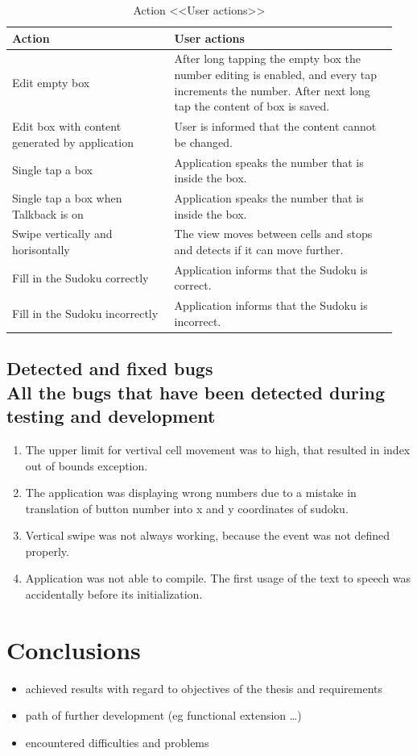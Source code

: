 \documentclass[a4paper,twoside,12pt]{book}
\newcommand\tabularhead[1]{
\begin{table}[h]
  \caption{Action <<#1>>}
  \begin{tabular}{|p{0.4\linewidth}|p{0.55\linewidth}|}
    \hline
    \textbf{Action} & \textbf{#1} \\
    \hline}
\newcommand\addrow[2]{#1 &#2\\ \hline}
\newcommand\addmulrow[2]{ \begin{minipage}[t][][t]{2.5cm}#1\end{minipage}%
     &\begin{minipage}[t][][t]{8cm}
      \begin{enumerate} #2   \end{enumerate}
      \end{minipage}\\ }
\newenvironment{usecase}{\tabularhead}
{\hline\end{tabular}\end{table}}
\begin{document}
\begin{usecase}{User actions}
    \addrow{Edit empty box}{After long tapping the empty box the number editing is enabled, and every tap increments the number. After next long tap the content of box is saved.}

    \addrow{Edit box with content generated by application}{User is informed that the content cannot be changed.}

	\addrow{Single tap a box}{Application speaks the number that is inside the box.}
	\addrow{Single tap a box when Talkback is on}{Application speaks the number that is inside the box.}
	\addrow{Swipe vertically and horisontally}{The view moves between cells and stops and detects if it can move further.}
	\addrow{Fill in the Sudoku correctly}{Application informs that the Sudoku is correct.}
	\addrow{Fill in the Sudoku incorrectly}{Application informs that the Sudoku is incorrect.}
	
\end{usecase}

\section{Detected and fixed bugs\\ {\large All the bugs that have been detected during testing and development }}

\begin{enumerate}
	\item The upper limit for vertival cell movement was to high, that resulted in index out of bounds exception.
	\item The application was displaying wrong numbers due to a mistake in translation of button number into x and y coordinates of sudoku.
	\item Vertical swipe was not always working, because the event was not defined properly.
	\item Application was not able to compile. The first usage of the text to speech was accidentally before its initialization.
\end{enumerate}


\chapter{Conclusions}
\begin{itemize}
\item achieved results with regard to objectives of the thesis and requirements
\item path of further development (eg functional extension …)
\item encountered difficulties and problems
\end{itemize}
\end{document}
